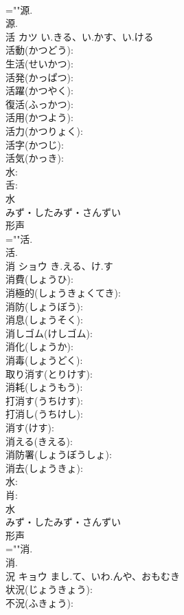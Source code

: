 \documentclass[8pt]{extreport}
\begin{document}
\begin{CJK}{UTF8}{min}
\\	=""源.
\\	源.
\\	活	カツ	い.きる、い.かす、い.ける		
\\	活動(かつどう): 
\\	生活(せいかつ): 
\\	活発(かっぱつ): 
\\	活躍(かつやく): 
\\	復活(ふっかつ): 
\\	活用(かつよう): 
\\	活力(かつりょく): 
\\	活字(かつじ): 
\\	活気(かっき): 
\\	水: 
\\	舌: 
\\	水	
\\	みず・したみず・さんずい	
\\	形声 
\\	=""活.
\\	活.
\\	消	ショウ	き.える、け.す		
\\	消費(しょうひ): 
\\	消極的(しょうきょくてき): 
\\	消防(しょうぼう): 
\\	消息(しょうそく): 
\\	消しゴム(けしゴム): 
\\	消化(しょうか): 
\\	消毒(しょうどく): 
\\	取り消す(とりけす): 
\\	消耗(しょうもう): 
\\	打消す(うちけす): 
\\	打消し(うちけし): 
\\	消す(けす): 
\\	消える(きえる): 
\\	消防署(しょうぼうしょ): 
\\	消去(しょうきょ): 
\\	水: 
\\	肖: 
\\	水	
\\	みず・したみず・さんずい	
\\	形声 
\\	=""消.
\\	消.
\\	況	キョウ	まし.て、いわ.んや、おもむき		
\\	状況(じょうきょう): 
\\	不況(ふきょう): 

\end{CJK}
\end{document}
